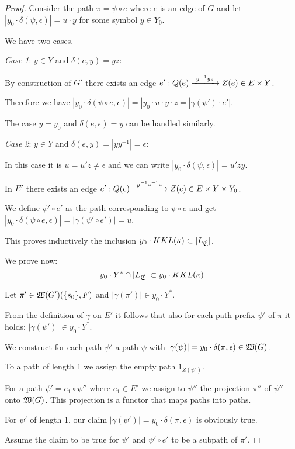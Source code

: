 \begin{proof}
Consider the path $\pi = \psi \circ e$ where $e$ is an edge of $G$ and let
$|y_0 \cdot \delta(\psi, \epsilon)| = u \cdot y$ for some symbol $y \in Y_0$.

We have two cases.

{\em Case 1}: $y \in Y$ and $\delta(e, y) = y z$:

By construction of $G'$ there exists an edge $e': Q(e) \xrightarrow{\ {y^{-1} y z}\ } Z(e)
\in E \times Y$.

Therefore we have $|y_0 \cdot \delta(\psi \circ e, \epsilon)| = |y_0 \cdot u
\cdot y \cdot z = |\gamma(\psi') \cdot e'|$.

The case $y=y_0$ and $\delta(e, \epsilon) = y$ can be handled similarly.

{\em Case 2}: $y \in Y$ and $\delta(e, y) = |y y^{-1}| = \epsilon$:

In this case it is $u = u' z \neq \epsilon$ and we can write $|y_0 \cdot
\delta(\psi, \epsilon)| = u'zy$.

In $E'$ there exists an edge $e' : Q(e) \xrightarrow{\ {y^{-1}z^{-1}z}\ } Z(e) \in E
\times Y \times Y_0$.

We define $\psi' \circ e'$ as the path corresponding to $\psi \circ e$ and get
$|y_0 \cdot \delta(\psi \circ e, \epsilon)| = |\gamma(\psi' \circ e')| = u$.

This proves inductively the inclusion $y_0 \cdot KKL(\kappa) \subset
|L_{\mbox{$\mathfrak{C}$}}|$.


We prove now:
\[ y_0 \cdot Y^* \cap |L_{\mbox{$\mathfrak{C}$}}| \subset y_0 \cdot KKL(\kappa) \]

Let $\pi' \in \mbox{$\mathfrak{W}(G')$}(\mbox{$\{s_0\}$}, F)$ and $|\gamma(\pi')| \in y_0 \cdot
Y^*$.

From the definition of $\gamma$ on $E'$ it follows that also for each path
prefix $\psi'$ of $\pi$ it holds: $|\gamma(\psi')| \in y_0 \cdot Y^*$.

We construct for each path $\psi'$ a path $\psi$ with $|\gamma(\psi)| = y_0
\cdot \delta(\pi, \epsilon) \in \mbox{$\mathfrak{W}(G)$}$.

To a path of length 1 we assign the empty path $1_{Z(\psi')}$.

For a path $\psi' = e_1 \circ \psi''$ where $e_1 \in E'$ we assign to $\psi''$
the projection $\pi''$ of $\psi''$ onto $\mbox{$\mathfrak{W}(G)$}$. This projection is a
functor that maps paths into paths.

For $\psi'$ of length 1, our claim $|\gamma(\psi')| = y_0 \cdot \delta(\pi,
\epsilon)$ is obviously true.

Assume the claim to be true for $\psi'$ and $\psi' \circ e'$ to be a subpath of
$\pi'$.


\end{proof}
